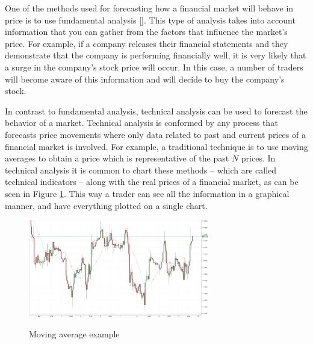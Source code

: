 
One of the methods used for forecasting how a financial market will behave in
price is to use fundamental analysis \ref{}. This type of analysis takes into %
account information that you can gather from the factors that influence the %
market's price. For example, if a company releases their financial statements
and they demonstrate that the company is performing financially well, it is very
likely that a surge in the company's stock price will occur. In this case, a
number of traders will become aware of this information and will decide to buy
the company's stock.

In contrast to fundamental analysis, technical analysis can be used to forecast
the behavior of a market. Technical analysis is conformed by any process that
forecasts price movements where only data related to past and current prices of
a financial market is involved. For example, a traditional technique is to use
moving averages to obtain a price which is representative of the past $N$
prices. In technical analysis it is common to chart these methods -- which are
called technical indicators -- along with the real prices of a financial market,
as can be seen in Figure \ref{figure:moving-average-example}. This way a trader
can see all the information in a graphical manner, and have everything plotted
on a single chart.


\begin{figure}
  \caption{Moving average example} \centering
  \includegraphics[width=0.7\textwidth]{img/moving-average.png}
  \label{figure:moving-average-example}
\end{figure}

